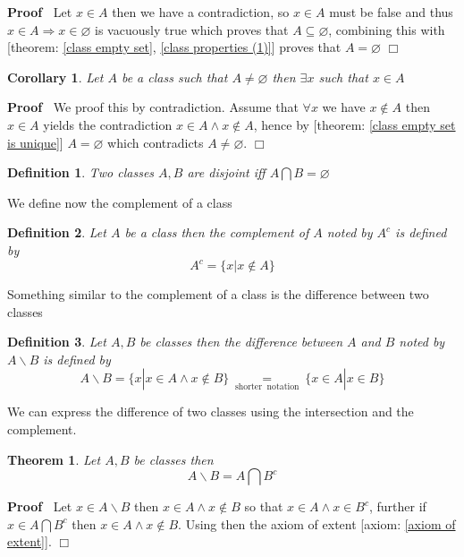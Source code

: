\documentclass{book}
\newcommand{\equallim}{\mathop{=}\limits}
\newcommand{\nin}{\not\in}
\newcommand{\tmop}[1]{\ensuremath{\operatorname{#1}}}
\newenvironment{proof}{\noindent\textbf{Proof\ }}{\hspace*{\fill}$\Box$\medskip}
\newtheorem{corollary}{Corollary}
\newtheorem{definition}{Definition}
{\theorembodyfont{\rmfamily}\newtheorem{example}{Example}}
\newtheorem{theorem}{Theorem}
\begin{document}
\begin{proof}
  Let $x \in A$ then we have a contradiction, so $x \in A$ must be false and
  thus $x \in A \Rightarrow x \in \varnothing$ is vacuously true which proves
  that $A \subseteq \varnothing$, combining this with [theorem: \ref{class
  empty set}, \ref{class properties (1)}] proves that $A = \varnothing$
\end{proof}

\begin{corollary}
  \label{class not empty sets}Let $A$ be a class such that $A \neq
  \varnothing$ then $\exists x$ such that $x \in A$
\end{corollary}

\begin{proof}
  We proof this by contradiction. Assume that $\forall x$ we have $x \nin A$
  then $x \in A$ yields the contradiction $x \in A \wedge x \nin A$, hence by
  [theorem: \ref{class empty set is unique}] $A = \varnothing$ which
  contradicts $A \neq \varnothing$.
\end{proof}

\begin{definition}
  Two classes $A, B$ are disjoint iff $A \bigcap B = \varnothing$
\end{definition}

We define now the complement of a class

\begin{definition}
  Let $A$ be a class then the complement of $A$ noted by $A^c$ is defined by
  \[ A^c = \{ x|x \nin A \} \]
\end{definition}

Something similar to the complement of a class is the difference between two
classes

\begin{definition}
  Let $A, B$ be classes then the difference between $A$ and $B$ noted by
  $A\backslash B$ is defined by
  \[ A\backslash B = \{ x|x \in A \wedge x \nin B \}
     \equallim_{\tmop{shorter} \tmop{notation}} \{ x \in A|x \in B \} \]
\end{definition}

We can express the difference of two classes using the intersection and the
complement.

\begin{theorem}
  \label{class difference}Let $A, B$ be classes then
  \[ A\backslash B = A \bigcap B^c \]
\end{theorem}

\begin{proof}
  Let $x \in A\backslash B$ then $x \in A \wedge x \nin B$ so that $x \in A
  \wedge x \in B^c$, further if $x \in A \bigcap B^c$ then $x \in A \wedge x
  \nin B$. Using then the axiom of extent [axiom: \ref{axiom of extent}].
\end{proof}
\end{document}
